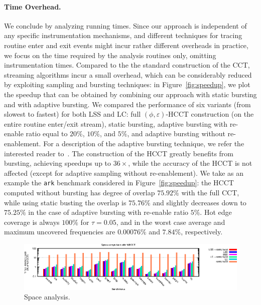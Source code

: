 \documentclass[preprint]{sigplanconf}
\begin{document}
\paragraph{Time Overhead.} We conclude by analyzing running times. Since our approach is independent of any specific instrumentation mechanisms, and different techniques for tracing routine enter and exit events might incur rather different overheads in practice, we focus on the time required by the analysis routines only, omitting instrumentation times. Compared to the the standard construction of the CCT, streaming algorithms incur a small overhead, which can be considerably reduced by exploiting sampling and bursting techniques: in Figure~\ref{fig:speedup}, we plot the speedup that can be obtained by combining our approach with static bursting and with adaptive bursting. We compared the performance of six variants (from slowest to fastest) for both LSS and LC: full $(\phi,\varepsilon)$-HCCT construction (on the entire routine enter/exit stream), static bursting, adaptive bursting with re-enable ratio equal to $20\%$,  $10\%$,  and $5\%$, and adaptive bursting without re-enablement. For a description of the adaptive bursting technique, we refer the interested reader to~\cite{ZSCC06}. The construction of the HCCT greatly benefits from bursting, achieving speedups up to $36\times$, while the accuracy of the HCCT is not affected (except for adaptive sampling without re-enablement). We take as an example the {\tt ark} benchmark considered in Figure~\ref{fig:speedup}: the HCCT computed without bursting has degree of overlap $75.92\%$ with the full CCT, while using static busting the overlap is $75.76\%$ and slightly decreases down to $75.25\%$ in the case of adaptive bursting with re-enable ratio $5\%$. Hot edge coverage is always $100\%$ for $\tau=0.05$, and in the worst case average and maximum uncovered frequencies are $0.00076\%$ and $7.84\%$, respectively. 




\begin{figure}[t]
\center\includegraphics[width=7.4 cm]{charts/space.eps}
\caption{Space analysis.}
\label{fig:VMPeak}
\end{figure} 
\end{document}
